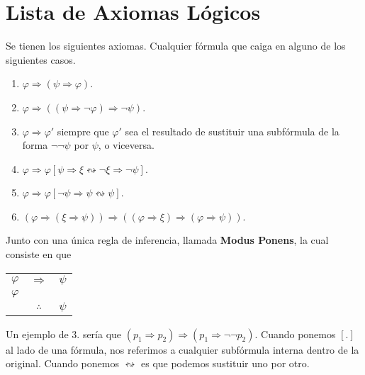 \documentclass[12pt]{report}
\newcounter{it}
\theoremstyle{largebreak}
\begin{document}
    \section{Lista de Axiomas Lógicos}    

    \begin{mydef}
        Se tienen los siguientes axiomas. Cualquier fórmula que caiga en alguno de los siguientes casos.
        \begin{enumerate}
            \item $\varphi\Rightarrow (\psi\Rightarrow \varphi)$.
            \item $\varphi\Rightarrow ((\psi\Rightarrow\neg\varphi)\Rightarrow \neg\psi)$.
            \item $\varphi\Rightarrow\varphi'$ siempre que $\varphi'$ sea el resultado de sustituir una subfórmula de la forma $\neg\neg\psi$ por $\psi$, o viceversa.
            \item $\varphi\Rightarrow \varphi[\psi\Rightarrow\xi \leftrightsquigarrow\neg\xi\Rightarrow \neg\psi]$.
            \item $\varphi\Rightarrow\varphi[\neg\psi\Rightarrow\psi\leftrightsquigarrow\psi]$.
            \item $(\varphi\Rightarrow(\xi\Rightarrow\psi))\Rightarrow((\varphi\Rightarrow\xi)\Rightarrow(\varphi\Rightarrow\psi))$.
        \end{enumerate}
        Junto con una única regla de inferencia, llamada \textbf{Modus Ponens}, la cual consiste en que
        \begin{center}
            \begin{tabular}{c c c}
                $\varphi$ & $\Rightarrow$ & $\psi$ \\
                $\varphi$ &  &  \\
                \hline
                 & $\therefore$ & $\psi$ \\
            \end{tabular}
        \end{center}
    \end{mydef}

    Un ejemplo de 3. sería que $(p_1\Rightarrow p_2)\Rightarrow(p_1\Rightarrow \neg\neg p_2)$. Cuando ponemos $[.]$ al lado de una fórmula, nos referimos a cualquier subfórmula interna dentro de la original. Cuando ponemos $\leftrightsquigarrow$ es que podemos sustituir uno por otro.
\end{document}
